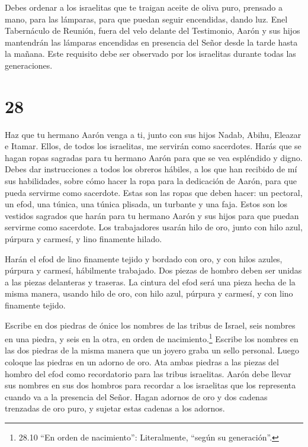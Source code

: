  Debes ordenar a los israelitas que te traigan aceite de
oliva puro, prensado a mano, para las lámparas, para que puedan seguir
encendidas, dando luz.  Enel Tabernáculo de Reunión, fuera
del velo delante del Testimonio, Aarón y sus hijos mantendrán las
lámparas encendidas en presencia del Señor desde la tarde hasta la
mañana. Este requisito debe ser observado por los israelitas durante
todas las generaciones.

\hypertarget{section-27}{%
\section{28}\label{section-27}}

 Haz que tu hermano Aarón venga a ti, junto con sus hijos
Nadab, Abihu, Eleazar e Itamar. Ellos, de todos los israelitas, me
servirán como sacerdotes.  Harás que se hagan ropas sagradas
para tu hermano Aarón para que se vea espléndido y digno. 
Debes dar instrucciones a todos los obreros hábiles, a los que han
recibido de mí sus habilidades, sobre cómo hacer la ropa para la
dedicación de Aarón, para que pueda servirme como sacerdote.
 Estas son las ropas que deben hacer: un pectoral, un efod,
una túnica, una túnica plisada, un turbante y una faja. Estos son los
vestidos sagrados que harán para tu hermano Aarón y sus hijos para que
puedan servirme como sacerdote.  Los trabajadores usarán
hilo de oro, junto con hilo azul, púrpura y carmesí, y lino finamente
hilado.

 Harán el efod de lino finamente tejido y bordado con oro, y
con hilos azules, púrpura y carmesí, hábilmente trabajado. 
Dos piezas de hombro deben ser unidas a las piezas delanteras y
traseras.  La cintura del efod será una pieza hecha de la
misma manera, usando hilo de oro, con hilo azul, púrpura y carmesí, y
con lino finamente tejido.

 Escribe en dos piedras de ónice los nombres de las tribus
de Israel,  seis nombres en una piedra, y seis en la otra,
en orden de nacimiento.\footnote{28.10 ``En orden de nacimiento'':
  Literalmente, ``según su generación''.}  Escribe los
nombres en las dos piedras de la misma manera que un joyero graba un
sello personal. Luego coloque las piedras en un adorno de oro.
 Ata ambas piedras a las piezas del hombro del efod como
recordatorio para las tribus israelitas. Aarón debe llevar sus nombres
en sus dos hombros para recordar a los israelitas que los representa
cuando va a la presencia del Señor.  Hagan adornos de oro
 y dos cadenas trenzadas de oro puro, y sujetar estas
cadenas a los adornos.

